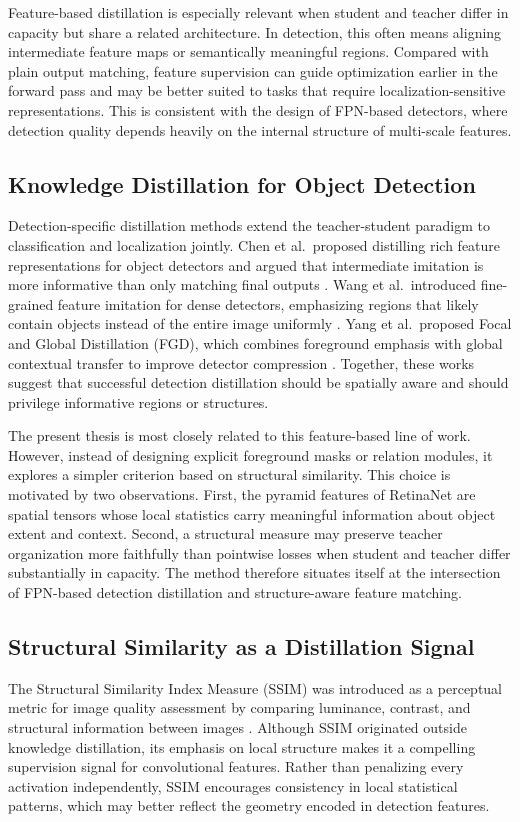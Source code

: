 \documentclass[12pt]{article}
\begin{document}
Feature-based distillation is especially relevant when student and teacher differ in capacity but share a related architecture. In detection, this often means aligning intermediate feature maps or semantically meaningful regions. Compared with plain output matching, feature supervision can guide optimization earlier in the forward pass and may be better suited to tasks that require localization-sensitive representations. This is consistent with the design of FPN-based detectors, where detection quality depends heavily on the internal structure of multi-scale features.

\subsection{Knowledge Distillation for Object Detection}
Detection-specific distillation methods extend the teacher-student paradigm to classification and localization jointly. Chen et al.\ proposed distilling rich feature representations for object detectors and argued that intermediate imitation is more informative than only matching final outputs \cite{chen2017learning}. Wang et al.\ introduced fine-grained feature imitation for dense detectors, emphasizing regions that likely contain objects instead of the entire image uniformly \cite{wang2019distilling}. Yang et al.\ proposed Focal and Global Distillation (FGD), which combines foreground emphasis with global contextual transfer to improve detector compression \cite{yang2022focal}. Together, these works suggest that successful detection distillation should be spatially aware and should privilege informative regions or structures.

The present thesis is most closely related to this feature-based line of work. However, instead of designing explicit foreground masks or relation modules, it explores a simpler criterion based on structural similarity. This choice is motivated by two observations. First, the pyramid features of RetinaNet are spatial tensors whose local statistics carry meaningful information about object extent and context. Second, a structural measure may preserve teacher organization more faithfully than pointwise losses when student and teacher differ substantially in capacity. The method therefore situates itself at the intersection of FPN-based detection distillation and structure-aware feature matching.

\subsection{Structural Similarity as a Distillation Signal}
The Structural Similarity Index Measure (SSIM) was introduced as a perceptual metric for image quality assessment by comparing luminance, contrast, and structural information between images \cite{wang2004ssim}. Although SSIM originated outside knowledge distillation, its emphasis on local structure makes it a compelling supervision signal for convolutional features. Rather than penalizing every activation independently, SSIM encourages consistency in local statistical patterns, which may better reflect the geometry encoded in detection features.
\end{document}
